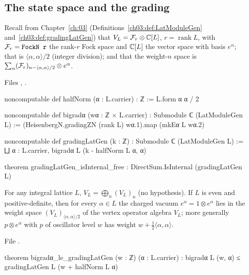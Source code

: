 \subsection{The state space and the grading}

Recall from Chapter~\ref{ch:03} (Definitions~\ref{ch03:def:LatModuleGen} and~\ref{ch03:def:gradingLatGen})
that $V_L=\mathcal{F}_r\otimes{\mathbb{C}}[L]$, $r=\operatorname{rank}L$, with $\lfiveF_r=\lean{FockN r}$ the rank-$r$ Fock space
and ${\mathbb{C}}[L]$ the vector space with basis $e^\alpha$; that  is $\langle\alpha,\alpha\rangle/2$
(integer division); and that the weight-$n$ space is $\sum_\alpha(\mathcal{F}_r)_{n-\langle\alpha,\alpha\rangle/2}\otimes e^\alpha$.

\noindent Files , .
\begin{leancode}
noncomputable def halfNorm (α : L.carrier) : ℤ := L.form α α / 2

noncomputable def bigradα (wα : ℤ × L.carrier) : Submodule ℂ (LatModuleGen L) :=
  (HeisenbergN.gradingZN (rank L) wα.1).map (mkEα L wα.2)

noncomputable def gradingLatGen (k : ℤ) : Submodule ℂ (LatModuleGen L) :=
  ⨆ α : L.carrier, bigradα L (k - halfNorm L α, α)

theorem gradingLatGen_isInternal_free : DirectSum.IsInternal (gradingLatGen L)
\end{leancode}

\begin{theorem}\label{l05:thm:latgrading}
For any integral lattice $L$, $V_L=\bigoplus_n(V_L)_n$ (no hypothesis). If $L$ is even and positive-definite,
then for every $\alpha\in L$ the charged vacuum $e^\alpha=1\otimes e^\alpha$ lies in the weight space
$(V_L)_{\langle\alpha,\alpha\rangle/2}$ of the vertex operator algebra $V_L$; more generally
$p\otimes e^\alpha$ with $p$ of oscillator level $w$ has weight $w+\frac12\langle\alpha,\alpha\rangle$.
\end{theorem}

\noindent File .
\begin{leancode}
theorem bigradα_le_gradingLatGen (w : ℤ) (α : L.carrier) :
    bigradα L (w, α) ≤ gradingLatGen L (w + halfNorm L α)
\end{leancode}

